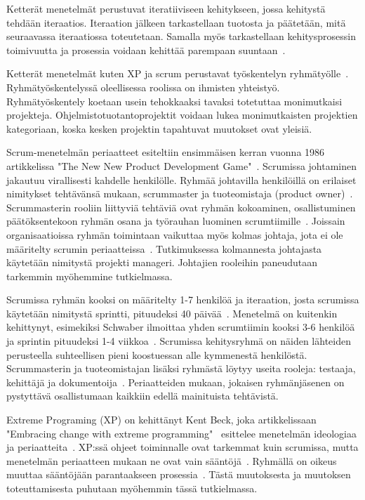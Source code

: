 \documentclass[finnish]{tktltiki2}
\theoremstyle{definition}
\theoremstyle{remark}
\begin{document}
Ketterät menetelmät perustuvat iteratiiviseen kehitykseen, jossa kehitystä tehdään iteraatios\cite{cohen2004introduction}. Iteraation jälkeen tarkastellaan tuotosta ja päätetään, mitä seuraavassa iteraatiossa toteutetaan. Samalla myös tarkastellaan kehitysprosessin toimivuutta ja prosessia voidaan kehittää parempaan suuntaan~\cite{cohen2004introduction}.


Ketterät menetelmät kuten XP ja scrum perustavat työskentelyn ryh\-mä\-työl\-le~\cite{4755768}. Ryhmätyöskentelyssä oleellisessa roolissa on ihmisten yhteistyö. Ryhmätyöskentely koetaan usein tehokkaaksi tavaksi totetuttaa monimutkaisi projekteja. Ohjelmistotuotantoprojektit voidaan lukea monimutkaisten projektien kategoriaan, koska kesken projektin tapahtuvat muutokset ovat yleisiä.

Scrum-menetelmän periaatteet esiteltiin ensimmäisen kerran vuonna 1986 artikkelissa "The New New Product Development Game"~\cite{nonaka1986new}. Scrumissa johtaminen jakautuu virallisesti kahdelle henkilölle. Ryhmää johtavilla henkilöillä on erilaiset nimitykset tehtävänsä mukaan, scrummaster ja tuoteomistaja (product owner)~\cite{4755768}. Scrummasterin rooliin liittyviä tehtäviä ovat ryhmän kokoaminen, osallistuminen päätöksentekoon ryhmän osana ja työrauhan luominen scrumtiimille~\cite{4755768}. Joissain organisaatioissa ryhmän toimintaan vaikuttaa myös kolmas johtaja, jota ei ole määritelty scrumin periaatteissa~\cite{4755768}. Tutkimuksessa kolmannesta johtajasta käytetään nimitystä projekti manageri. Johtajien rooleihin paneudutaan tarkemmin myöhemmine tutkielmassa. 

Scrumissa ryhmän kooksi on määritelty 1-7 henkilöä ja iteraation, josta scrumissa käytetään nimitystä sprintti, pituudeksi 40 päivää~\cite{cohen2004introduction}. Menetelmä on kuitenkin kehittynyt, esimekiksi Schwaber ilmoittaa yhden scrumtiimin kooksi 3-6 henkilöä ja sprintin pituudeksi 1-4 viikkoa~\cite{schwaber1995scrum}. Scrumissa kehitysryhmä on näiden lähteiden perusteella suhteellisen pieni koostuessan alle kymmenestä henkilöstä. Scrummasterin ja tuoteomistajan lisäksi ryhmästä löytyy useita rooleja: testaaja, kehittäjä ja dokumentoija~\cite{schwaber1995scrum}. Periaatteiden mukaan, jokaisen ryhmänjäsenen on pystyttävä osallistumaan kaikkiin edellä mainituista tehtävistä.

Extreme Programing (XP) on kehittänyt Kent Beck, joka artikkelissaan "Embracing change with extreme programming"  \ esittelee menetelmän ideologiaa ja periaatteita~\cite{796139}. XP:ssä ohjeet toiminnalle ovat tarkemmat kuin scrumissa, mutta menetelmän periaatteen mukaan ne ovat vain sääntöjä~\cite{cohen2004introduction}. Ryhmällä on oikeus muuttaa sääntöjään parantaakseen prosessia~\cite{cohen2004introduction}. Tästä muutoksesta ja muutoksen toteuttamisesta puhutaan myöhemmin tässä tutkielmassa.
\end{document}
